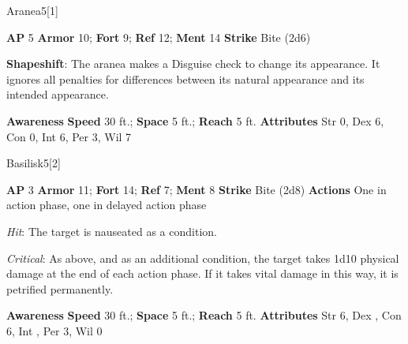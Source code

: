 \begin{monsection}{Aranea}{5}[1]
\vspace{-1em}\vspace{-1em}
\begin{spellcontent}
\begin{spelltargetinginfo}
{\textbf{AP} 5}
\pari \textbf{Armor} 10;
\textbf{Fort} 9;
\textbf{Ref} 12;
\textbf{Ment} 14
\pari \textbf{Strike} Bite  (2d6)
\end{spelltargetinginfo}
\begin{spelleffects}
\pari
\textbf{Shapeshift}:
The aranea makes a Disguise check to change its appearance.
It ignores all penalties for differences between its natural appearance and its intended appearance.
\end{spelleffects}
\end{spellcontent}
\begin{spellsubcontent}
\begin{spellfooter}
\pari \textbf{Awareness} 
\pari \textbf{Speed} 30 ft.;
\textbf{Space} 5 ft.;
\textbf{Reach} 5 ft.
\pari \textbf{Attributes}
Str 0,
Dex 6,
Con 0,
Int 6,
Per 3,
Wil 7
\end{spellfooter}
\end{spellsubcontent}
\end{monsection}
\begin{monsection}{Basilisk}{5}[2]
\vspace{-1em}\vspace{-1em}
\begin{spellcontent}
\begin{spelltargetinginfo}
{\textbf{AP} 3}
\pari \textbf{Armor} 11;
\textbf{Fort} 14;
\textbf{Ref} 7;
\textbf{Ment} 8
\pari \textbf{Strike} Bite  (2d8)
\pari \textbf{Actions} One in action phase, one in delayed action phase
\end{spelltargetinginfo}
\begin{spelleffects}
\pari
{}
\par
\par \textit{Hit}: The target is nauseated as a condition.
\par \textit{Critical}:
As above, and as an additional condition, the target takes 1d10 physical damage at the end of each action phase.
If it takes vital damage in this way, it is petrified permanently.
\end{spelleffects}
\end{spellcontent}
\begin{spellsubcontent}
\begin{spellfooter}
\pari \textbf{Awareness} 
\pari \textbf{Speed} 30 ft.;
\textbf{Space} 5 ft.;
\textbf{Reach} 5 ft.
\pari \textbf{Attributes}
Str 6,
Dex ,
Con 6,
Int ,
Per 3,
Wil 0
\end{spellfooter}
\end{spellsubcontent}
\end{monsection}
